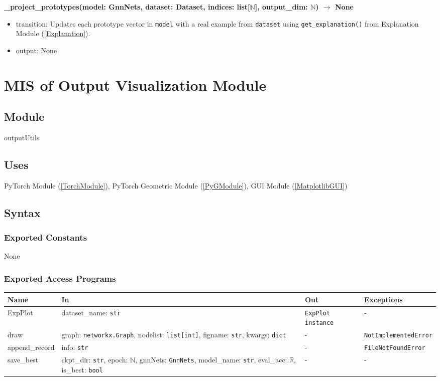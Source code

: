\documentclass[12pt, titlepage]{article}
\begin{document}
\noindent \textbf{\_project\_prototypes(model: GnnNets, dataset: Dataset, indices: list[\(\mathbb{N}\)], output\_dim: \(\mathbb{N}\)) \(\rightarrow\) None}
\begin{itemize}
  \item transition: Updates each prototype vector in \texttt{model} with a real example from \texttt{dataset} using \texttt{get\_explanation()} from Explanation Module (\ref{Explanation}).
  \item output: None
\end{itemize}





\newpage






\section{MIS of Output Visualization Module} \label{OutputVisualization}

\subsection{Module}
outputUtils

\subsection{Uses}
PyTorch Module (\ref{TorchModule}), PyTorch Geometric Module (\ref{PyGModule}), GUI Module (\ref{MatplotlibGUI})

\subsection{Syntax}

\subsubsection{Exported Constants}
None

\subsubsection{Exported Access Programs}
\begin{center}
\begin{tabular}{p{3.2cm} p{6cm} p{3.5cm} p{3.3cm}}
\hline
\textbf{Name} & \textbf{In} & \textbf{Out} & \textbf{Exceptions} \\
\hline
ExpPlot & dataset\_name: \texttt{str} & \texttt{ExpPlot instance} & - \\
draw & graph: \texttt{networkx.Graph}, nodelist: \texttt{list[int]}, figname: \texttt{str}, kwargs: \texttt{dict} & - & \texttt{NotImplementedError} \\
append\_record & info: \texttt{str} & - & \texttt{FileNotFoundError} \\
save\_best & ckpt\_dir: \texttt{str}, epoch: \(\mathbb{N}\), gnnNets: \texttt{GnnNets}, model\_name: \texttt{str}, eval\_acc: \(\mathbb{R}\), is\_best: \texttt{bool} & - & - \\
\hline
\end{tabular}
\end{center}
\end{document}
